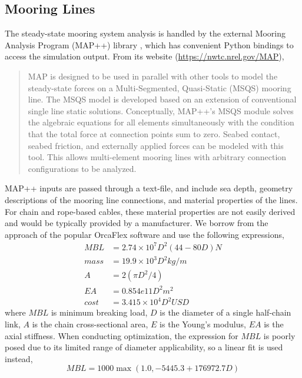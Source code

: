 \subsection{Mooring Lines}
The steady-state mooring system analysis is handled by the external Mooring Analysis
Program (MAP++) library \citep{MAP}, which has convenient Python bindings
to access the simulation output.  From its website
(\url{https://nwtc.nrel.gov/MAP}),
\begin{quote}
  MAP is designed to be used in parallel with other tools to model the
  steady-state forces on a Multi-Segmented, Quasi-Static (MSQS) mooring
  line. The MSQS model is developed based on an extension of
  conventional single line static solutions. Conceptually, MAP++'s MSQS
  module solves the algebraic equations for all elements simultaneously
  with the condition that the total force at connection points sum to
  zero. Seabed contact, seabed friction, and externally applied forces
  can be modeled with this tool. This allows multi-element mooring lines
  with arbitrary connection configurations to be analyzed.
\end{quote}

MAP++ inputs are passed through a text-file, and include sea depth, geometry
descriptions of the mooring line connections, and material properties of
the lines.  For chain and rope-based cables, these material properties
are not easily derived and would be typically provided by a
manufacturer.  We borrow from the approach of the popular OrcaFlex
software \citet{orca} and use the following expressions,
\begin{align*}
MBL &= 2.74\times 10^7  D^2 \left(44 - 80D\right) \unit{N} \\
mass &= 19.9\times 10^3 D^2 \unit{kg/m}\\
A &= 2\left(\pi D^2 / 4 \right)\\
EA &= 0.854e11 D^2\unit{m^2}\\
cost &= 3.415\times 10^4 D^2 \unit{USD}
\end{align*}
where $MBL$ is minimum breaking load, $D$ is the diameter of a single
half-chain link, $A$ is the chain cross-sectional area, $E$ is the
Young's modulus, $EA$ is the axial stiffness.  When conducting
optimization, the expression for $MBL$ is poorly posed due to its limited
range of diameter applicability, so a linear fit is used instead,
\[
MBL = 1000 \max\left(1.0, -5445.3 + 176972.7 D\right)
\]  
